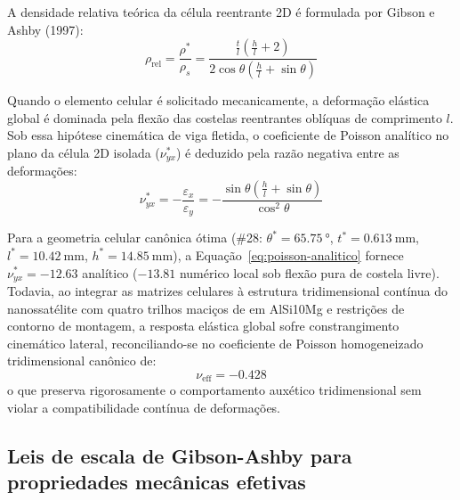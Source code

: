 A densidade relativa teórica da célula reentrante 2D é formulada por Gibson e Ashby (1997):
\begin{equation}
  \rho_{\text{rel}} = \frac{\rho^*}{\rho_s} = \frac{\frac{t}{l} \left( \frac{h}{l} + 2 \right)}{2 \cos\theta \left( \frac{h}{l} + \sin\theta \right)}
  \label{eq:rho-ga}
\end{equation}

Quando o elemento celular é solicitado mecanicamente, a deformação elástica global é dominada pela flexão das costelas reentrantes oblíquas de comprimento $l$. Sob essa hipótese cinemática de viga fletida, o coeficiente de Poisson analítico no plano da célula 2D isolada ($\nu_{yx}^*$) é deduzido pela razão negativa entre as deformações:
\begin{equation}
  \nu_{yx}^* = -\frac{\varepsilon_x}{\varepsilon_y} = -\frac{\sin\theta \left( \frac{h}{l} + \sin\theta \right)}{\cos^2\theta}
  \label{eq:poisson-analitico}
\end{equation}

Para a geometria celular canônica ótima (\#28: $\theta^* = \SI{65.75}{\degree}$, $t^* = \SI{0.613}{\milli\metre}$, $l^* = \SI{10.42}{\milli\metre}$, $h^* = \SI{14.85}{\milli\metre}$), a Equação~\eqref{eq:poisson-analitico} fornece $\nu_{yx}^* = \num{-12.63}$ analítico ($\num{-13.81}$ numérico local sob flexão pura de costela livre). Todavia, ao integrar as matrizes celulares à estrutura tridimensional contínua do nanossatélite com quatro trilhos maciços de \rail{} em AlSi10Mg e restrições de contorno de montagem, a resposta elástica global sofre constrangimento cinemático lateral, reconciliando-se no coeficiente de Poisson homogeneizado tridimensional canônico de:
\begin{equation}
  \nu_{\text{eff}} = \num{-0.428}
  \label{eq:poisson-3d-reconciled}
\end{equation}
o que preserva rigorosamente o comportamento auxético tridimensional sem violar a compatibilidade contínua de deformações.

\subsection{Leis de escala de Gibson-Ashby para propriedades mecânicas efetivas}
\label{subsec:rev-gibson-ashby}

